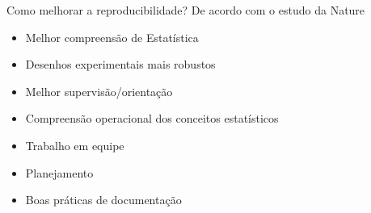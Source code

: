 \documentclass{beamer}
\begin{document}
\begin{frame}
  \begin{block}{Como melhorar a reproducibilidade?}
    De acordo com o estudo da Nature
    \begin{itemize}
    \item Melhor compreensão de Estatística
    \item Desenhos experimentais mais robustos
    \item Melhor supervisão/orientação
    \end{itemize}
  \end{block}
\end{frame}


\begin{frame}{}
  \begin{itemize}
  \item Compreensão operacional dos conceitos estatísticos
  \item Trabalho em equipe
  \item Planejamento
  \item Boas práticas de documentação
  \end{itemize}
\end{frame}
\end{document}
